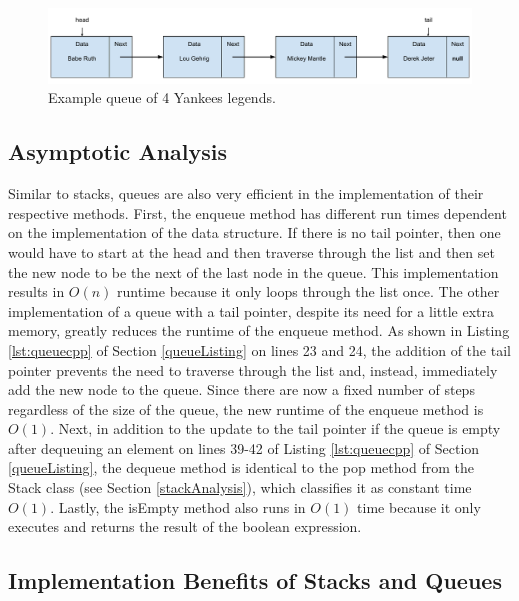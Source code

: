 \documentclass[letterpaper, 10pt,DIV=13]{scrartcl}
\numberwithin{equation}{section} %
\numberwithin{figure}{section} %
\numberwithin{table}{section} %
\begin{document}
\begin{figure}[ht] 
    \centering 
    \includegraphics[width=15cm]{queue}
    \caption{Example queue of 4 Yankees legends.}
    \label{figure:queue}
\end{figure}

\subsection{Asymptotic Analysis}\label{queueAnalysis}
Similar to stacks, queues are also very efficient in the implementation of their respective methods. First, the enqueue method has different run times dependent on the implementation of the data structure. If there is no tail pointer, then one would have to start at the head and then traverse through the list and then set the new node to be the next of the last node in the queue. This implementation results in $O(n)$ runtime because it only loops through the list once. The other implementation of a queue with a tail pointer, despite its need for a little extra memory, greatly reduces the runtime of the enqueue method. As shown in Listing \ref{lst:queuecpp} of Section \ref{queueListing} on lines 23 and 24, the addition of the tail pointer prevents the need to traverse through the list and, instead, immediately add the new node to the queue. Since there are now a fixed number of steps regardless of the size of the queue, the new runtime of the enqueue method is $O(1)$. Next, in addition to the update to the tail pointer if the queue is empty after dequeuing an element on lines 39-42 of Listing \ref{lst:queuecpp} of Section \ref{queueListing}, the dequeue method is identical to the pop method from the Stack class (see Section \ref{stackAnalysis}), which classifies it as constant time $O(1)$. Lastly, the isEmpty method also runs in $O(1)$ time because it only executes and returns the result of the boolean expression.



\subsection{Implementation Benefits of Stacks and Queues}
\end{document}
